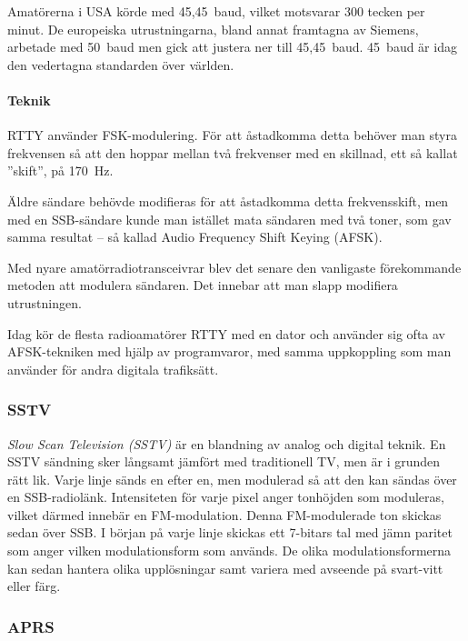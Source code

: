 Amatörerna i USA körde med 45,45~baud, vilket motsvarar 300 tecken per minut.
De europeiska utrustningarna, bland annat framtagna av Siemens, arbetade med
50~baud men gick att justera ner till 45,45~baud.
45~baud är idag den vedertagna standarden över världen.

\paragraph{Teknik}

RTTY använder FSK-modulering.
För att åstadkomma detta behöver man styra frekvensen så att den hoppar mellan
två frekvenser med en skillnad, ett så kallat ''skift'', på \SI{170}{\hertz}.

Äldre sändare behövde modifieras för att åstadkomma detta frekvensskift, men
med en SSB-sändare kunde man istället mata sändaren med två toner, som gav
samma resultat -- så kallad Audio Frequency Shift Keying (AFSK).

Med nyare amatörradiotransceivrar blev det senare den vanligaste förekommande
metoden att modulera sändaren.
Det innebar att man slapp modifiera utrustningen.

Idag kör de flesta radioamatörer RTTY med en dator och använder sig ofta av
AFSK-tekniken med hjälp av programvaror, med samma uppkoppling som man använder
för andra digitala trafiksätt.

\subsubsection{SSTV}

\emph{Slow Scan Television (SSTV)} är en blandning av analog och digital teknik.
En SSTV sändning sker långsamt jämfört med traditionell TV, men är i grunden
rätt lik.
Varje linje sänds en efter en, men modulerad så att den kan sändas över en
SSB-radiolänk.
Intensiteten för varje pixel anger tonhöjden som moduleras, vilket därmed
innebär en FM-modulation.
Denna FM-modulerade ton skickas sedan över SSB.
I början på varje linje skickas ett 7-bitars tal med jämn paritet som anger
vilken modulationsform som används.
De olika modulationsformerna kan sedan hantera olika upplösningar samt
variera med avseende på svart-vitt eller färg.

\subsubsection{APRS}
\label{modulation_aprs}

